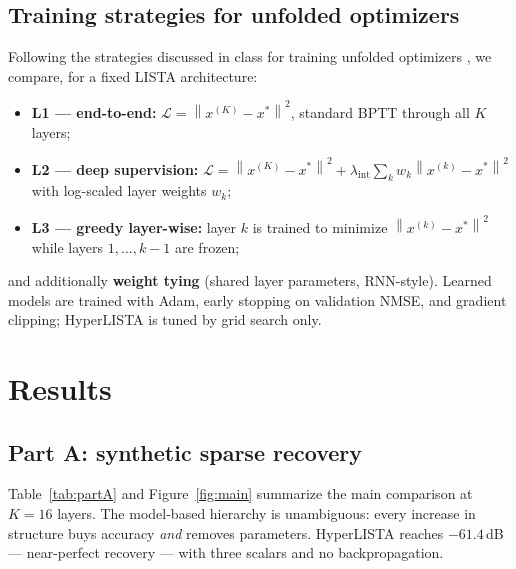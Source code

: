 \documentclass[12pt,a4paper]{article}
\newcommand{\norm}[1]{\left\lVert #1 \right\rVert}
\begin{document}
\subsection{Training strategies for unfolded optimizers}

Following the strategies discussed in class for training unfolded optimizers \cite{lecturenotes}, we compare, for a fixed LISTA architecture:
\begin{itemize}\itemsep2pt
  \item \textbf{L1 --- end-to-end:} $\mathcal L = \norm{x^{(K)} - x^*}^2$, standard BPTT through all $K$ layers;
  \item \textbf{L2 --- deep supervision:} $\mathcal L = \norm{x^{(K)} - x^*}^2 + \lambda_{\mathrm{int}} \sum_k w_k \norm{x^{(k)} - x^*}^2$ with log-scaled layer weights $w_k$;
  \item \textbf{L3 --- greedy layer-wise:} layer $k$ is trained to minimize $\norm{x^{(k)} - x^*}^2$ while layers $1,\dots,k{-}1$ are frozen;
\end{itemize}
and additionally \textbf{weight tying} (shared layer parameters, RNN-style). Learned models are trained with Adam, early stopping on validation NMSE, and gradient clipping; HyperLISTA is tuned by grid search only.

\section{Results}
\label{sec:results}

\subsection{Part A: synthetic sparse recovery}

Table~\ref{tab:partA} and Figure~\ref{fig:main} summarize the main comparison at $K=16$ layers. The model-based hierarchy is unambiguous: every increase in structure buys accuracy \emph{and} removes parameters. HyperLISTA reaches $-61.4$\,dB --- near-perfect recovery --- with three scalars and no backpropagation.
\end{document}
